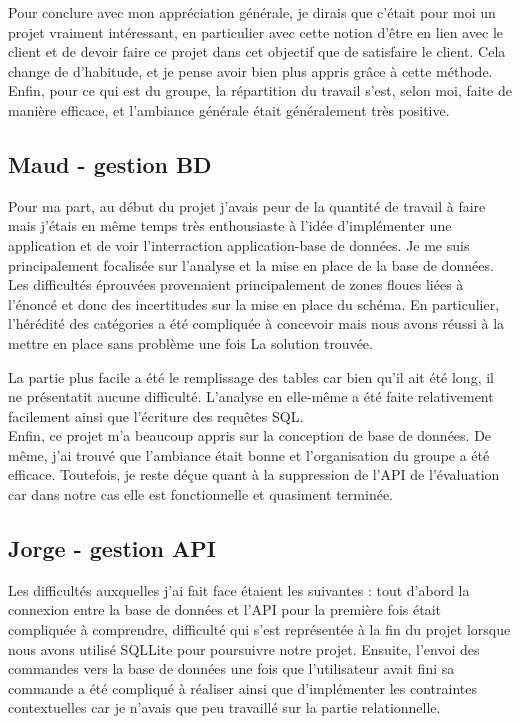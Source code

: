 \documentclass[10pt, a4paper]{article}
\begin{document}
Pour conclure avec mon appréciation générale, je dirais que c'était pour moi un projet vraiment
intéressant, en particulier avec cette notion d'être en lien avec le client et de devoir faire ce projet dans cet objectif que de satisfaire le client.
Cela change de d'habitude, et je pense avoir bien plus appris grâce à cette méthode.
Enfin, pour ce qui est du groupe, la répartition du travail s'est, selon moi, faite de manière efficace, et l'ambiance générale était généralement très positive.

\subsection{Maud - gestion BD}
Pour ma part, au début du projet j'avais peur de la quantité de travail à faire mais j'étais
en même temps très enthousiaste à l'idée d'implémenter une application et de voir l'interraction
application-base de données. Je me suis principalement focalisée sur l'analyse et la mise en
place de la base de données.\\

Les difficultés éprouvées provenaient principalement de zones floues liées à l'énoncé et donc
des incertitudes sur la mise en place du schéma. En particulier, l'hérédité des catégories a été
compliquée à concevoir mais nous avons réussi à la mettre en place sans problème une fois La
solution trouvée.

La partie plus facile a été le remplissage des tables car bien qu'il ait été long, il ne
présentatit aucune difficulté. L'analyse en elle-même a été faite relativement facilement
ainsi que l'écriture des requêtes SQL.\\

Enfin, ce projet m'a beaucoup appris sur la conception de base de données. De même, j'ai trouvé
que l'ambiance était bonne et l'organisation du groupe a été efficace. Toutefois, je reste déçue
quant à la suppression de l'API de l'évaluation car dans notre cas elle est fonctionnelle et quasiment terminée.

\subsection{Jorge - gestion API}
Les difficultés auxquelles j'ai fait face étaient les suivantes : tout d'abord la connexion entre la base de données
et l'API pour la première fois était compliquée à comprendre, difficulté qui s'est représentée
à la fin du projet lorsque nous avons utilisé SQLLite pour poursuivre notre projet. Ensuite,
l'envoi des commandes vers la base de données une fois que l'utilisateur avait fini sa commande
a été compliqué à réaliser ainsi que d'implémenter les contraintes contextuelles car je
n'avais que peu travaillé sur la partie relationnelle. \\
\end{document}
